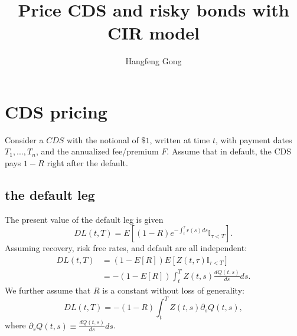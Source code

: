 \documentclass[a4paper,twoside,10pt]{report}
\begin{document}
\pagestyle{empty} %



\title{Price CDS and risky bonds with CIR model}
\author{Hangfeng Gong}
\maketitle

\tableofcontents %

\cleardoublepage %

\pagestyle{plain} %









\chapter{CDS pricing}
Consider a $CDS$ with the notional of $\$1$, written at time $t$, with payment dates $T_1, ..., T_n$, and the annualized fee/premium $F$. Assume that in default, the CDS pays $1-R$ right after the default. 

\section{the default leg}
The present value of the default leg is given \[ DL(t,T) = E[(1-R)e^{-\int_t^{\tau}r(s)ds}\mathbb{I}_{\tau<T}] .\] Assuming recovery, risk free rates, and default are all independent:
\begin{equation} 
\begin{split}
DL(t,T) & = (1-E[R])E[Z(t,\tau)\mathbb{I}_{\tau < T}] \\
 & = -(1-E[R])\int_t^T Z(t,s) \frac{dQ(t,s)}{ds} ds.
\end{split}
\end{equation}
We further assume that $R$ is a constant without loss of generality: \[ DL(t,T)= -(1-R)\int_t^T Z(t,s) \partial_s Q(t,s) ,\] where $\partial_s Q(t,s) \equiv \frac{dQ(t,s)}{ds} ds$.
\end{document}
